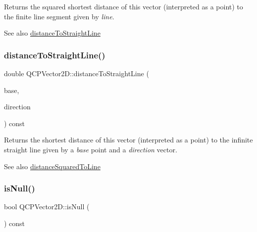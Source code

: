 Returns the squared shortest distance of this vector (interpreted as a point) to the finite line segment given by {\itshape line}.

\begin{DoxySeeAlso}{See also}
\hyperlink{class_q_c_p_vector2_d_ae240b845c3744e43a5d0aa7b2bb66c19}{distance\+To\+Straight\+Line} 
\end{DoxySeeAlso}
\mbox{\label{class_q_c_p_vector2_d_ae240b845c3744e43a5d0aa7b2bb66c19}} 
\subsubsection{\texorpdfstring{distance\+To\+Straight\+Line()}{distanceToStraightLine()}}
{\footnotesize\ttfamily double Q\+C\+P\+Vector2\+D\+::distance\+To\+Straight\+Line (\begin{DoxyParamCaption}\item[{const \hyperlink{class_q_c_p_vector2_d}{Q\+C\+P\+Vector2D} \&}]{base,  }\item[{const \hyperlink{class_q_c_p_vector2_d}{Q\+C\+P\+Vector2D} \&}]{direction }\end{DoxyParamCaption}) const}

Returns the shortest distance of this vector (interpreted as a point) to the infinite straight line given by a {\itshape base} point and a {\itshape direction} vector.

\begin{DoxySeeAlso}{See also}
\hyperlink{class_q_c_p_vector2_d_a14840cd3da80cfee4eb3f8977cab89ab}{distance\+Squared\+To\+Line} 
\end{DoxySeeAlso}
\mbox{\label{class_q_c_p_vector2_d_ace99f200b347b14864808213eef16593}} 
\subsubsection{\texorpdfstring{is\+Null()}{isNull()}}
{\footnotesize\ttfamily bool Q\+C\+P\+Vector2\+D\+::is\+Null (\begin{DoxyParamCaption}{ }\end{DoxyParamCaption}) const\hspace{0.3cm}{\ttfamily [inline]}}

